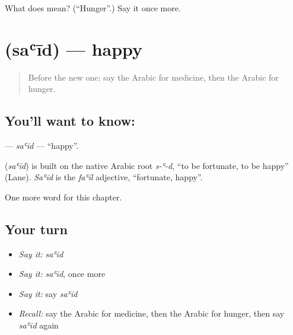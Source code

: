 \begin{tcolorbox}[breakable,colback=teal!4,colframe=teal!35!black,title={Before you move on}]
What does  mean? (\textquotedblleft{}Hunger\textquotedblright{}.) Say it once more.
\end{tcolorbox}
\section[\texorpdfstring{\ar{سعيد} (saʿīd)}{سعيد (saʿīd)}]{ (saʿīd) — happy}

\label{lesson:AR-C54-said}



\begin{quote}
Before the new one: say the Arabic for medicine, then the Arabic for hunger.
\end{quote}

\subsection*{You'll want to know: }
\textbf{} — \emph{saʿīd} — \textquotedblleft{}happy\textquotedblright{}.

\begin{cousinweb}
\textbf{} (\emph{saʿīd}) is built on the native Arabic root \emph{s-ʿ-d}, \textquotedblleft{}to be fortunate, to be happy\textquotedblright{} (Lane). \emph{Saʿīd} is the \emph{faʿīl} adjective, \textquotedblleft{}fortunate, happy\textquotedblright{}.
\end{cousinweb}

\begin{grammarlens}[title={What you've built}]
One more word for this chapter.
\end{grammarlens}

\subsection*{Your turn}
\begin{itemize}
\raggedright
  \item \emph{Say it:} \emph{saʿīd}
  \item \emph{Say it:} \emph{saʿīd}, once more
  \item \emph{Say it:} say \emph{saʿīd}
  \item \emph{Recall:} say the Arabic for medicine, then the Arabic for hunger, then say \emph{saʿīd} again
\end{itemize}

